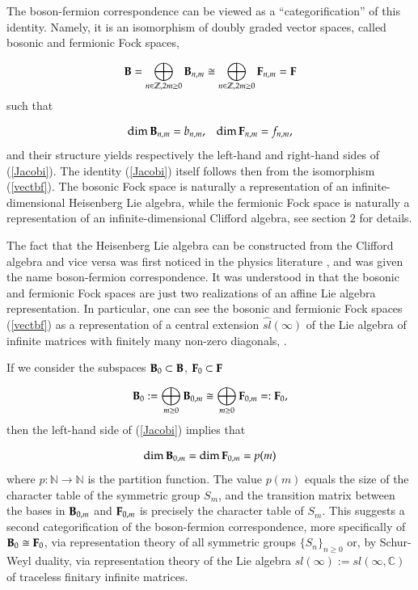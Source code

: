 \documentclass[11pt]{amsart}
\newcommand {\ZZ} {\mathbb {Z}}
\newcommand {\NN} {\mathbb {N}}
\begin{document}
The boson-fermion correspondence can be viewed as a ``categorification'' of this identity.
Namely, it is an isomorphism of doubly graded vector spaces, called bosonic and fermionic 
Fock spaces,

\begin{equation}\label{vectbf}
 \bold{B} = \bigoplus_{n \in \ZZ, 2m \geq 0} \bold{B}_{n,m} \cong \bigoplus_{n \in \ZZ, 2m \geq 0} \bold{F}_{n,m} = \bold{F}
\end{equation}
such that

\begin{equation}\label{vectcons}
  \dim \bold{B}_{n,m} = b_{n,m}, \;\;\;  \dim \bold{F}_{n,m} = f_{n,m},\nonumber
\end{equation}
and their structure yields respectively the left-hand and right-hand sides of (\ref{Jacobi}). The 
identity (\ref{Jacobi}) itself follows then from the isomorphism (\ref{vectbf}). The bosonic Fock space
is naturally a representation of an infinite-dimensional Heisenberg Lie algebra, while the 
fermionic Fock space is naturally a representation of an infinite-dimensional Clifford
algebra, see section $2$ for details.

The fact that the Heisenberg Lie algebra can be constructed from the Clifford algebra and vice versa was 
first noticed in the physics literature \cite{Mn}, and was given the name boson-fermion correspondence.
It was understood in \cite{F} that the bosonic and fermionic Fock spaces are just two realizations of 
an affine Lie algebra representation. In particular, one can see the bosonic and fermionic Fock
spaces (\ref{vectbf}) as a representation of  a central extension $\widehat{sl}(\infty)$ of the
Lie algebra of infinite matrices with finitely many non-zero diagonals, \cite{DJKM}. 


If we consider the subspaces $ \bold{B}_0\subset  \bold{B}$, $\bold{F}_0\subset \bold{F}$

\begin{equation}\label{sub}
 \bold{B}_0 := \bigoplus_{m \geq 0} \bold{B}_{0,m} \cong \bigoplus_{m \geq 0} \bold{F}_{0,m} =: \bold{F}_0,
\end{equation}
then the left-hand side of (\ref{Jacobi}) implies that

\begin{equation}\label{subdim}
 \dim \bold{B}_{0,m} = \dim\bold{F}_{0,m} = p(m)\nonumber
\end{equation}
where $p:\NN\to \NN$ is the partition function. The value $p(m)$ equals the size of the character table of the symmetric group $S_m$, and
the transition matrix between the bases in $\bold{B}_{0,m}$ and $\bold{F}_{0,m}$ is precisely the 
character table of $S_m$. This suggests a second categorification of the boson-fermion correspondence, more
specifically of $\bold{B}_0 \cong \bold{F}_0$, via representation theory of all symmetric groups
$\{S_n\}_{n \geq 0}$ or, by Schur-Weyl duality, via representation theory of the Lie algebra $sl(\infty):=sl(\infty,\mathbb C)$ 
of traceless finitary infinite matrices.
\end{document}
